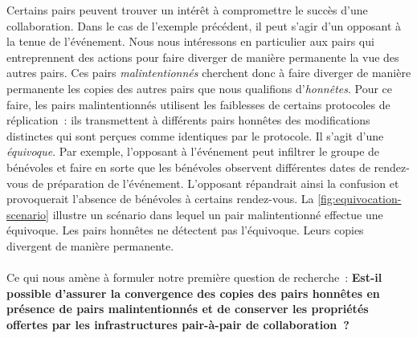 Certains pairs peuvent trouver un intérêt à compromettre le succès d'une collaboration.
Dans le cas de l'exemple précédent, il peut s'agir d'un opposant à la tenue de l'événement.
Nous nous intéressons en particulier aux pairs qui entreprennent des actions pour faire diverger de manière permanente la vue des autres pairs.
Ces pairs \emph{malintentionnés} cherchent donc à faire diverger de manière permanente les copies des autres pairs que nous qualifions d'\emph{honnêtes}.
Pour ce faire, les pairs malintentionnés utilisent les faiblesses de certains protocoles de réplication~: ils transmettent à différents pairs honnêtes des modifications distinctes qui sont perçues comme identiques par le protocole.
Il s'agit d'une \emph{équivoque}.
Par exemple, l'opposant à l'événement peut infiltrer le groupe de bénévoles et faire en sorte que les bénévoles observent différentes dates de rendez-vous de préparation de l'événement.
L'opposant répandrait ainsi la confusion et provoquerait l'absence de bénévoles à certains rendez-vous.
La \autoref{fig:equivocation-scenario} illustre un scénario dans lequel un pair malintentionné effectue une équivoque.
Les pairs honnêtes ne détectent pas l'équivoque.
Leurs copies divergent de manière permanente.

\paragraph{}Ce qui nous amène à formuler notre première question de recherche~: \textbf{Est-il possible d'assurer la convergence des copies des pairs honnêtes en présence de pairs malintentionnés et de conserver les propriétés offertes par les infrastructures pair-à-pair de collaboration~?}

\clearpage %

